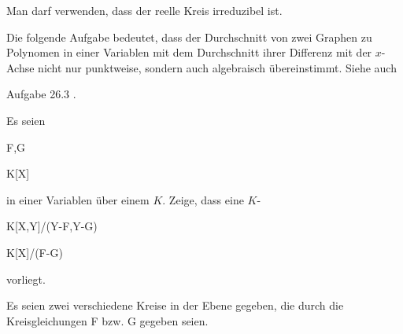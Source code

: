 {} {Man darf verwenden, dass der reelle Kreis irreduzibel ist.}


Die folgende Aufgabe bedeutet, dass der Durchschnitt von zwei Graphen zu Polynomen in einer Variablen mit dem Durchschnitt ihrer Differenz mit der $x$-Achse nicht nur punktweise, sondern auch algebraisch übereinstimmt. Siehe auch

Aufgabe 26.3
.




{}


{


Es seien


\mavergleichskette


{\vergleichskette


{ F,G
}


{ \in }{ K[X]
}


{  }{
}


{    }{
}


{   }{
}


}
{}{}{}
in einer Variablen über einem
$K$. Zeige, dass eine
$K$-


\mavergleichskettedisp


{\vergleichskette


{ K[X,Y]/(Y-F,Y-G)
}


{ \cong} { K[X]/(F-G)
}


{ } {
}


{ } {
}


{ } {
}


}
{}{}{}
vorliegt.


}


{} {}




{}


{


Es seien zwei verschiedene Kreise in der Ebene gegeben, die durch die Kreisgleichungen
\mathkor {} {F} {bzw.} {G} {}
gegeben seien.


}


